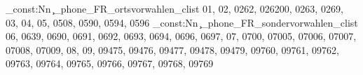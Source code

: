 \clist_const:Nn \c_phone_FR_ortsvorwahlen_clist {01,
02,
0262,
026200,
0263,
0269,
03,
04,
05,
0508,
0590,
0594,
0596}
\clist_const:Nn \c_phone_FR_sondervorwahlen_clist {06,
0639,
0690,
0691,
0692,
0693,
0694,
0696,
0697,
07,
0700,
07005,
07006,
07007,
07008,
07009,
08,
09,
09475,
09476,
09477,
09478,
09479,
09760,
09761,
09762,
09763,
09764,
09765,
09766,
09767,
09768,
09769}
